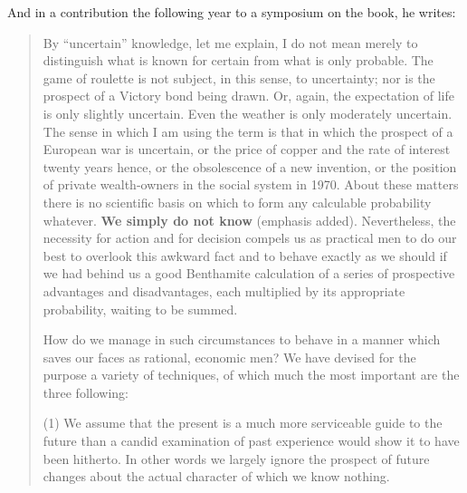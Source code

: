 \documentclass[
  11pt,
  letterpaper,
  DIV=11,
  numbers=noendperiod,
  oneside]{scrartcl}
\begin{document}
And in a contribution the following year to a symposium on the book, he
writes:

\begin{quote}
By ``uncertain'' knowledge, let me explain, I do not mean merely to
distinguish what is known for certain from what is only
probable. The game of roulette is not subject, in
this sense, to uncertainty; nor is the prospect of a Victory bond being
drawn. Or, again, the expectation of life is only
slightly uncertain. Even the weather is only moderately
uncertain. The sense in which I am using the term is that in which
the prospect of a European war is uncertain, or the price of copper and the
rate of interest twenty years hence, or the obsolescence of a new
invention,
or the position of private wealth-owners in the social system in
1970. About these matters there is no scientific basis on which
to form any calculable probability whatever. \textbf{We simply do not
know} (emphasis added). Nevertheless, the necessity for action and for
decision compels us as practical men to do our best to overlook this
awkward fact and to behave exactly as we should if we had behind us a
good Benthamite calculation of a series of prospective advantages and
disadvantages, each multiplied by its appropriate probability, waiting
to be summed.

How do we manage in such circumstances to behave in a manner which saves
our faces as rational, economic men? We have devised for the purpose a
variety of techniques, of which much the most important are the three
following:

(1) We assume that the present is a much more serviceable guide to the
future than a candid examination of past experience would show it to
have been hitherto. In other words we largely ignore the prospect of
future changes about the actual character of which we know
nothing.


\end{quote}
\end{document}
